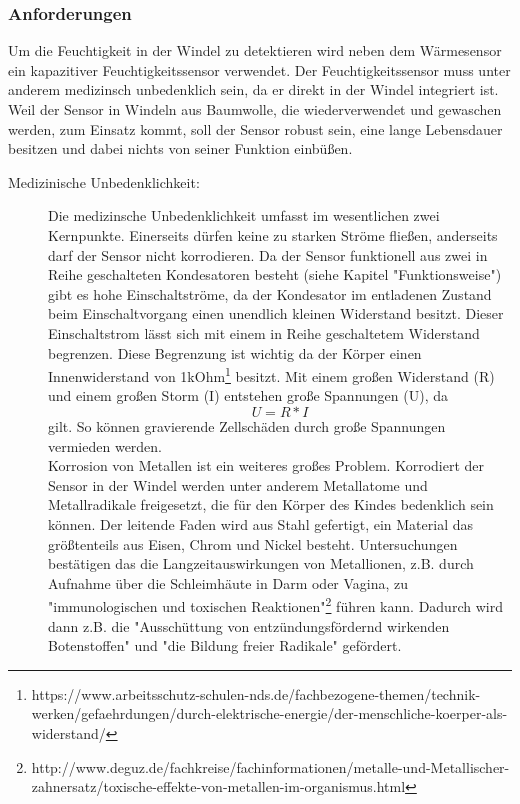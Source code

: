 \subsubsection{Anforderungen}
\label{sec:cap_requirements}
Um die Feuchtigkeit in der Windel zu detektieren wird neben dem Wärmesensor ein kapazitiver Feuchtigkeitssensor verwendet. Der Feuchtigkeitssensor muss unter anderem medizinsch unbedenklich sein, da er direkt in der Windel integriert ist. Weil der Sensor in Windeln aus Baumwolle, die wiederverwendet und gewaschen werden, zum Einsatz kommt, soll der Sensor robust sein, eine lange Lebensdauer besitzen und dabei nichts von seiner Funktion einbüßen.

\begin{description}
\item[Medizinische Unbedenklichkeit:]
Die medizinsche Unbedenklichkeit umfasst im wesentlichen zwei Kernpunkte. Einerseits dürfen keine zu starken Ströme fließen, anderseits darf der Sensor nicht korrodieren. Da der Sensor funktionell aus zwei in Reihe geschalteten Kondesatoren besteht (siehe Kapitel "Funktionsweise") gibt es hohe Einschaltströme, da der Kondesator im entladenen Zustand beim Einschaltvorgang einen unendlich kleinen Widerstand besitzt. Dieser Einschaltstrom lässt sich mit einem in Reihe geschaltetem Widerstand begrenzen. Diese Begrenzung ist wichtig da der Körper einen Innenwiderstand von 1kOhm\footnote{https://www.arbeitsschutz-schulen-nds.de/fachbezogene-themen/technik-werken/gefaehrdungen/durch-elektrische-energie/der-menschliche-koerper-als-widerstand/} besitzt. Mit einem großen Widerstand (R) und einem großen Storm (I) entstehen große Spannungen (U), da
\[U = R * I\]  gilt. So können gravierende Zellschäden durch große Spannungen vermieden werden. \\
Korrosion von Metallen ist ein weiteres großes Problem. Korrodiert der Sensor in der Windel werden unter anderem Metallatome und Metallradikale freigesetzt, die für den Körper des Kindes bedenklich sein können. Der leitende Faden wird aus Stahl gefertigt, ein Material das größtenteils aus Eisen, Chrom und Nickel besteht. Untersuchungen bestätigen das die Langzeitauswirkungen von Metallionen, z.B. durch Aufnahme über die Schleimhäute in Darm oder Vagina, zu "immunologischen und toxischen Reaktionen"\footnote{http://www.deguz.de/fachkreise/fachinformationen/metalle-und-Metallischer-zahnersatz/toxische-effekte-von-metallen-im-organismus.html} führen kann. Dadurch wird dann z.B. die "Ausschüttung von entzündungsfördernd wirkenden Botenstoffen" und "die Bildung freier Radikale" gefördert.
	

\end{description}
